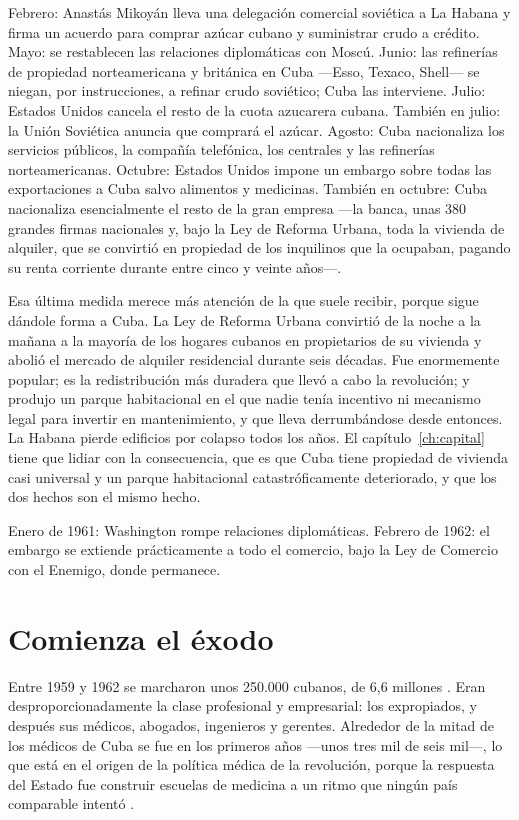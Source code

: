 Febrero: Anastás Mikoyán lleva una delegación comercial soviética a La Habana y
firma un acuerdo para comprar azúcar cubano y suministrar crudo a crédito. Mayo:
se restablecen las relaciones diplomáticas con Moscú. Junio: las refinerías de
propiedad norteamericana y británica en Cuba ---Esso, Texaco, Shell--- se niegan,
por instrucciones, a refinar crudo soviético; Cuba las interviene. Julio: Estados
Unidos cancela el resto de la cuota azucarera cubana. También en julio: la Unión
Soviética anuncia que comprará el azúcar. Agosto: Cuba nacionaliza los servicios
públicos, la compañía telefónica, los centrales y las refinerías norteamericanas.
Octubre: Estados Unidos impone un embargo sobre todas las exportaciones a Cuba
salvo alimentos y medicinas. También en octubre: Cuba nacionaliza esencialmente
el resto de la gran empresa ---la banca, unas 380 grandes firmas nacionales y,
bajo la Ley de Reforma Urbana, toda la vivienda de alquiler, que se convirtió en
propiedad de los inquilinos que la ocupaban, pagando su renta corriente durante
entre cinco y veinte años---.

Esa última medida merece más atención de la que suele recibir, porque sigue
dándole forma a Cuba. La Ley de Reforma Urbana convirtió de la noche a la mañana
a la mayoría de los hogares cubanos en propietarios de su vivienda y abolió el
mercado de alquiler residencial durante seis décadas. Fue enormemente popular; es
la redistribución más duradera que llevó a cabo la revolución; y produjo un parque
habitacional en el que nadie tenía incentivo ni mecanismo legal para invertir en
mantenimiento, y que lleva derrumbándose desde entonces. La Habana pierde
edificios por colapso todos los años. El capítulo~\ref{ch:capital} tiene que
lidiar con la consecuencia, que es que Cuba tiene propiedad de vivienda casi
universal y un parque habitacional catastróficamente deteriorado, y que los dos
hechos son el mismo hecho.

Enero de 1961: Washington rompe relaciones diplomáticas. Febrero de 1962: el
embargo se extiende prácticamente a todo el comercio, bajo la Ley de Comercio con
el Enemigo, donde permanece.

\section{Comienza el éxodo}

Entre 1959 y 1962 se marcharon unos 250.000 cubanos, de 6,6 millones
\citep{eckstein2003}.\unv{} Eran desproporcionadamente la clase profesional y
empresarial: los expropiados, y después sus médicos, abogados, ingenieros y
gerentes. Alrededor de la mitad de los médicos de Cuba se fue en los primeros
años ---unos tres mil de seis mil---, lo que está en el origen de la política
médica de la revolución, porque la respuesta del Estado fue construir escuelas de
medicina a un ritmo que ningún país comparable intentó
\citep{feinsilver1993}.\unv{}

